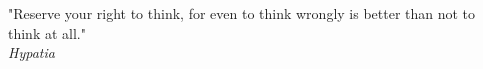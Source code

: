 \clearpage

\narrowlinespacing

\vspace*{7cm}
\begin{flushright}
 \hspace{5cm} "Reserve your right to think, for even to think wrongly is better than not to think at all."\\
\emph{Hypatia}

\end{flushright}
\normallinespacing